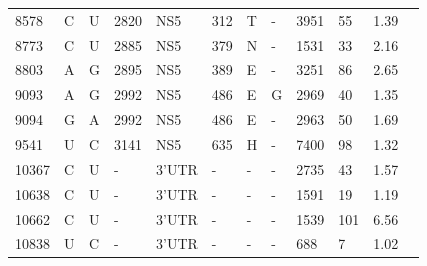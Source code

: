 \begin{longtabu}{X[l]X[l]X[l]X[l]X[l]X[l]X[l]X[l]X[l]X[l]X[l]X[l]}
 8578     & C    & U            & 2820              & NS5   & 312         & T                  & -                  & 3951           & 55               & 1.39   \\
 8773     & C    & U            & 2885              & NS5   & 379         & N                  & -                  & 1531           & 33               & 2.16   \\
 8803     & A    & G            & 2895              & NS5   & 389         & E                  & -                  & 3251           & 86               & 2.65   \\
 9093     & A    & G            & 2992              & NS5   & 486         & E                  & G                & 2969           & 40               & 1.35   \\
 9094     & G    & A            & 2992              & NS5   & 486         & E                  & -                  & 2963           & 50               & 1.69   \\
 9541     & U    & C            & 3141              & NS5   & 635         & H                  & -                  & 7400           & 98               & 1.32   \\
 10367    & C    & U           & -                 & 3'UTR & -           & -                    & -                  & 2735           & 43               & 1.57   \\
 10638    & C    & U            & -                 & 3'UTR & -           & -                    & -                  & 1591           & 19               & 1.19   \\
 10662    & C    & U            & -                 & 3'UTR & -           & -                    & -                  & 1539           & 101              & 6.56   \\
 10838    & U    & C            & -                 & 3'UTR & -           & -                    & -                  & 688            & 7                & 1.02   \\ 
		\bottomrule
	\end{longtabu}
